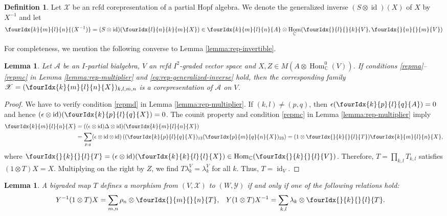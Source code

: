 \documentclass[10pt]{article}
\DeclareMathOperator{\id}{id}
\DeclareMathOperator{\Hom}{Hom}
\newcommand{\C}{\mathbb{C}}
\newcommand{\Gr}[5]{\fourIdx{#2}{#4}{#3}{#5}{#1}}%
\newcommand{\Gru}[3]{\Gr{#1}{}{}{#2}{#3}}
\newtheorem{Lem}[Theorem]{Lemma}
\theoremstyle{definition}
\newtheorem{Def}[Theorem]{Definition}
\numberwithin{equation}{section}
\begin{document}
\begin{Def}
  Let $\mathscr{X}$ be an rcfd corepresentation of a  partial Hopf
  algebra.  We  denote the generalized inverse $(S \otimes \id)(X)$
  of $X$  by $X^{-1}$ and let
  \begin{align*}
   \Gr{(X^{-1})}{k}{l}{m}{n}=(S \otimes \id)(\Gr{X}{l}{k}{n}{m}) \in
   \Gr{A}{k}{l}{m}{n} \otimes \Hom_{\C}(\Gru{V}{l}{k},\Gru{V}{n}{m})
  \end{align*}
\end{Def}
For completeness, we mention the following converse to Lemma \ref{lemma:rep-invertible}.
\begin{Lem}
  Let $\mathscr{A}$ be an $I$-partial bialgebra, $V$ an rcfd
  $I^{2}$-graded vector space and $X,Z \in M(A \otimes
  \Hom_{\C}^{0}(V))$. If conditions \ref{repma}--\ref{repmc} in Lemma
  \ref{lemma:rep-multiplier} and \eqref{eq:rep-generalized-inverse}
  hold, then the corresponding family
  $\mathscr{X}=(\Gr{X}{k}{l}{m}{n})_{k,l,m,n}$ is a corepresentation
  of $\mathscr{A}$ on $V$.
\end{Lem}
\begin{proof}
  We have to verify condition \ref{repmd} in Lemma
  \ref{lemma:rep-multiplier}.  If $(k,l) \neq (p,q)$, then
  $\epsilon(\Gr{A}{k}{l}{p}{q})=0$ and hence $(\epsilon
  \otimes \id)(\Gr{X}{k}{l}{p}{q}) =0$. The counit property and condition
  \ref{repmc} in Lemma \ref{lemma:rep-multiplier} imply 
\begin{align*}
  \Gr{X}{k}{l}{m}{n} &= ((\epsilon\otimes \id)  \Delta \otimes
  \id)(  \Gr{X}{k}{l}{m}{n}) 
\\ &  = \sum_{p,q} (\epsilon\otimes \id \otimes
  \id)\left((\Gr{X}{k}{l}{p}{q})_{13}(\Gr{X}{p}{q}{m}{n})_{23}\right)
  =  (1 \otimes \Gru{T}{k}{l})\Gr{X}{k}{l}{m}{n},
\end{align*}
where $\Gru{T}{k}{l}=(\epsilon \otimes \id)(\Gr{X}{k}{l}{k}{l}) \in
\Hom_{\C}(\Gru{V}{k}{l})$.  Therefore,  $T=\prod_{k,l} T_{k,l}$  satisfies $(1 \otimes T)X =
X$. Multiplying on the right by $Z$, we find
$T\lambda^{V}_{k}=\lambda^{V}_{k}$ for all $k$. Thus, $T=\id_{V}$.
\end{proof}

\begin{Lem} \label{lemma:rep-total-morphism}
 A bigraded map $T$ defines a morphism from 
    $(V,\mathscr{X})$ to $(W,\mathscr{Y})$ if and only if one of the following relations hold:
    \begin{align*}
      Y^{-1}(1 \otimes T)X&=\sum_{m,n} \rho_{n} \otimes \Gru{T}{m}{n},
      &
    Y(1\otimes T)X^{-1} &=\sum_{k,l} \lambda_{k} \otimes \Gru{T}{k}{l}.
    \end{align*}
\end{Lem}
\end{document}
